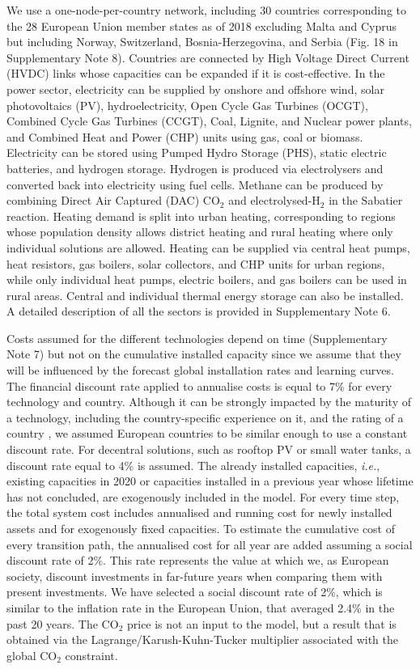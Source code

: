 \documentclass[5p]{elsarticle} %
\begin{document}
We use a one-node-per-country network, including 30 countries corresponding to the 28 European Union member states as of 2018 excluding Malta and Cyprus but including Norway, Switzerland, Bosnia-Herzegovina, and Serbia (Fig. 18 in Supplementary Note 8). Countries are connected by High Voltage Direct Current (HVDC) links whose capacities can be expanded if it is cost-effective. In the power sector, electricity can be supplied by onshore and offshore wind, solar photovoltaics (PV), hydroelectricity, Open Cycle Gas Turbines (OCGT), Combined Cycle Gas Turbines (CCGT), Coal, Lignite, and Nuclear power plants, and Combined Heat and Power (CHP) units using gas, coal or biomass. Electricity can be stored using Pumped Hydro Storage (PHS), static electric batteries, and hydrogen storage. Hydrogen is produced via electrolysers and converted back into electricity using fuel cells. Methane can be produced by combining Direct Air Captured (DAC) CO$_2$ and electrolysed-H$_2$ in the Sabatier reaction. Heating demand is split into urban heating, corresponding to regions whose population density allows district heating and rural heating where only individual solutions are allowed. Heating can be supplied via central heat pumps, heat resistors, gas boilers, solar collectors, and CHP units for urban regions, while only individual heat pumps, electric boilers, and gas boilers can be used in rural areas. Central and individual thermal energy storage can also be installed. A detailed description of all the sectors is provided in Supplementary Note 6. \

Costs assumed for the different technologies depend on time (Supplementary Note 7) but not on the cumulative installed capacity since we assume that they will be influenced by the forecast global installation rates and learning curves. The financial discount rate applied to annualise costs is equal to 7\% for every technology and country. Although it can be strongly impacted by the maturity of a technology, including the country-specific experience on it, and the rating of a country \cite{Egli_2019}, we assumed European countries to be similar enough to use a constant discount rate. For decentral solutions, such as rooftop PV or small water tanks, a discount rate equal to 4\% is assumed. The already installed capacities, \textit{i.e.}, existing capacities in 2020 or capacities installed in a previous year whose lifetime has not concluded, are exogenously included in the model. For every time step, the total system cost includes annualised and running cost for newly installed assets and for exogenously fixed capacities. To estimate the cumulative cost of every transition path, the annualised cost for all year are added assuming a social discount rate of 2\%. This rate represents the value at which we, as European society, discount investments in far-future years when comparing them with present investments. We have selected a social discount rate of 2\%, which is similar to the inflation rate in the European Union, that averaged 2.4\% in the past 20 years. The CO$_2$ price is not an input to the model, but a result that is obtained via the Lagrange/Karush-Kuhn-Tucker multiplier associated with the global CO$_2$ constraint. 
\end{document}
